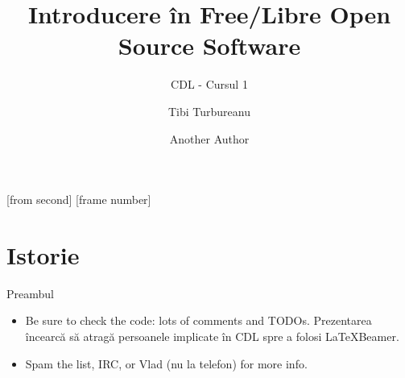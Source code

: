 \documentclass{beamer}
\title[Introducere \^in FLOSS]{Introducere \^in Free/Libre Open Source Software}
\subtitle{CDL - Cursul 1}
\institute[ROSEdu]{ROSEdu}
\author[Tibi]{Tibi Turbureanu \and Another Author}
\begin{document}
[from second]
[frame number]

\frame{\titlepage}

\begin{frame}
\tableofcontents
\end{frame}

\section{Istorie}


\begin{frame}{Preambul}
  \begin{itemize} %
  \item Be sure to check the code: lots of comments and TODOs.
  \alert{Prezentarea încearcă să atragă persoanele implicate în CDL spre a folosi
    \LaTeX Beamer.}
  \item Spam the list, IRC, or Vlad (nu la telefon) for more info.
  \end{itemize}
\end{frame}
\end{document}
